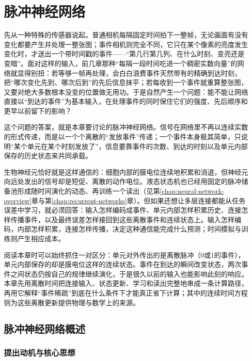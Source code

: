 \chapter{脉冲神经网络}
\label{chap:spiking-networks}

先从一种特殊的传感器说起。普通相机每隔固定时间拍下一整帧，无论画面有没有变化都要产生并处理一整张图；事件相机则完全不同，它只在某个像素的亮度发生变化时，才送出一个带时间戳的事件——“第几行第几列、在什么时刻、变亮还是变暗”。面对这样的输入，前几章那种“每隔一段时间吃进一个稠密实数向量”的网络就显得别扭：若等够一帧再处理，会白白浪费事件天然带有的精确到达时刻，把“哪次变化先到、哪次后到”的先后信息抹平；若每收到一个事件就重算整张图，又要对绝大多数根本没变的位置做无用功。于是自然产生一个问题：能不能让网络直接以“到达的事件”为基本输入，在处理事件的同时保住它们的强度、先后顺序和更早以前留下的影响？

这个问题的答案，就是本章要讨论的脉冲神经网络。信号在网络里不再以连续实数的形式传递，而是以一个个离散的“发放事件”传递；一个事件本身极其简单，只说明“某个单元在某个时刻发放了”，信息要靠事件的次数、到达的时刻以及单元内部保存的历史状态来共同承载。

生物神经元恰好就是这样通信的：细胞内部的膜电位连续地积累和消退，但神经元向远处发出的信号却是短促、离散的动作电位。液态状态机也已经用固定的脉冲储备池形成随时间演化的动态、再训练一个读出（见第\ref{chap:neural-network-overview}章与第\ref{chap:recurrent-networks}章）。但如果还想让多层连接都能从任务误差中学习，就必须回答：输入怎样编码成事件、单元内部怎样积累历史、连接怎样传播事件，以及最终误差怎样接回到这些离散事件和连续状态上。输入怎样编码，内部怎样积累，连接怎样传播，决定这种通信能完成什么预测；时间模拟与训练则产生相应成本。

阅读本章时可以始终抓住一对区分：单元对外传出的是离散脉冲（0或1的事件），单元内部保存的却是膜电位这样的连续状态。事件在到达的瞬间改变状态，两次事件之间状态仍按自己的规律继续演化，于是很久以前的输入也能影响此刻的响应。本章先用离散时间把连接输入、状态更新、学习和读出完整地串成一条计算路径，再用它解释“事件稀疏”到底在什么条件下才能真正省下计算；其中的连续时间方程则为这些离散更新提供物理与数学上的来源。

\section{脉冲神经网络概述}
\label{sec:snn-overview}

\subsection{提出动机与核心思想}
\label{sec:snn-motivation}

